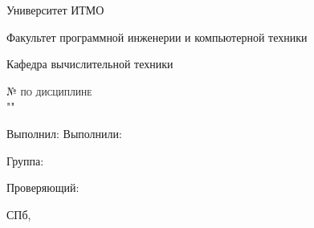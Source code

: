 \begin{titlepage}
	\begin{center}
		\large
		Университет ИТМО

		\vspace{0.25cm}
		
		Факультет программной инженерии и компьютерной техники
		
		Кафедра вычислительной техники
		\vfill
		
		\textsc{\labtype{} \ifisnum № \labnum{} \fi по дисциплине \\"\labsubj" \ifisname\small \\ \labname \fi}
			
		\bigskip
	\end{center}
	\vfill
	\vfill
	
	\begin{flushright}
	\ifisone
	Выполнил: \labauthor
	\else
	Выполнили: \labauthor
	\fi

	\vspace{0.25cm}
	Группа: \labgroup
			
	\vspace{0.25cm}
	\ifisinsp
	Проверяющий: \labinsp
	\fi
	\end{flushright}
	\vfill
	
	\begin{center}
	СПб, \the\year
	\end{center}
\end{titlepage}
